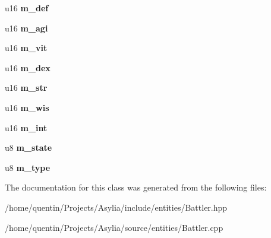 \begin{DoxyCompactItemize}
\item 
\hypertarget{classBattler_abc188979318689c7eda491375f2794cc}{u16 {\bfseries m\-\_\-def}}\label{classBattler_abc188979318689c7eda491375f2794cc}

\item 
\hypertarget{classBattler_a7be2a1c0ef98771cd867083b1d2b38f6}{u16 {\bfseries m\-\_\-agi}}\label{classBattler_a7be2a1c0ef98771cd867083b1d2b38f6}

\item 
\hypertarget{classBattler_aad63a605b7757b55d0c5b836dc8c4a0d}{u16 {\bfseries m\-\_\-vit}}\label{classBattler_aad63a605b7757b55d0c5b836dc8c4a0d}

\item 
\hypertarget{classBattler_a5f716afa3bcaba49408f0dc293e02257}{u16 {\bfseries m\-\_\-dex}}\label{classBattler_a5f716afa3bcaba49408f0dc293e02257}

\item 
\hypertarget{classBattler_a5c09ba534c9b9e133b59bc2ed7dc49bc}{u16 {\bfseries m\-\_\-str}}\label{classBattler_a5c09ba534c9b9e133b59bc2ed7dc49bc}

\item 
\hypertarget{classBattler_ac87d6f940aeadb8e373294bb29bbdceb}{u16 {\bfseries m\-\_\-wis}}\label{classBattler_ac87d6f940aeadb8e373294bb29bbdceb}

\item 
\hypertarget{classBattler_a4dca2ab4b28b02af7a1be72fb87d1289}{u16 {\bfseries m\-\_\-int}}\label{classBattler_a4dca2ab4b28b02af7a1be72fb87d1289}

\item 
\hypertarget{classBattler_ae14917ddafc1941695aff2da0a3a6c6f}{u8 {\bfseries m\-\_\-state}}\label{classBattler_ae14917ddafc1941695aff2da0a3a6c6f}

\item 
\hypertarget{classBattler_ac667548d7002c7967b03215be69bb46d}{u8 {\bfseries m\-\_\-type}}\label{classBattler_ac667548d7002c7967b03215be69bb46d}

\end{DoxyCompactItemize}


The documentation for this class was generated from the following files\-:\begin{DoxyCompactItemize}
\item 
/home/quentin/\-Projects/\-Asylia/include/entities/Battler.\-hpp\item 
/home/quentin/\-Projects/\-Asylia/source/entities/Battler.\-cpp\end{DoxyCompactItemize}
